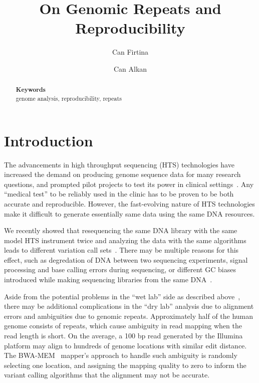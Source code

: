 \documentclass[10pt,a4paper]{article}
\date{}
\def\keywords#1{\begin{center}{\bf Keywords}\\{#1}\end{center}}
\def\titulo#1{\title{#1}}
\begin{document}
\titulo{On Genomic Repeats and Reproducibility}

\author[1]{Can Firtina}
\author[1]{Can Alkan}

\maketitle
\thispagestyle{empty}


\begin{abstract}

\keywords{genome analysis, reproducibility, repeats}
\end{abstract}

\section{Introduction}
The advancements in high throughput sequencing (HTS) technologies have increased the demand on producing genome sequence data for many research questions, and prompted pilot projects to test its
power in clinical settings~\cite{Biesecker2009}. Any ``medical test'' to be reliably used in the clinic has to be proven to be both accurate and reproducible.
However, the fast-evolving nature of HTS technologies make it difficult to generate essentially same data using the same DNA resources. 

We recently showed that resequencing the same DNA library 
with the same model HTS instrument twice and analyzing the data with the same algorithms leads to different variation call sets~\cite{Kavak2015}. There may be multiple reasons for this effect,
such as degredation of DNA between two sequencing experiments, signal processing and base calling errors during sequencing, or different GC biases introduced while making sequencing libraries from the
same DNA~\cite{Kavak2015}. 

Aside from the potential problems in the ``wet lab'' side as described above~\cite{Kavak2015}, 
there may be additional complications in the ``dry lab'' analysis due to alignment errors and ambiguities due to genomic repeats.
Approximately half of the human genome consists of repeats, which cause ambiguity in read mapping when the read length is short. On the average, a 100 bp read generated by the Illumina platform may align to hundreds of genome locations with similar edit distance. 
The BWA-MEM~\cite{Li2009a,Li2013} mapper's  approach to handle such ambiguity is randomly selecting one location, and assigning the mapping quality to zero to inform the variant calling algorithms that the alignment may not be accurate. 
\end{document}
